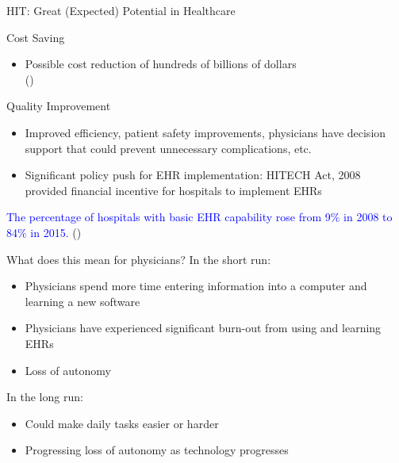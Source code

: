 \documentclass[10pt]{beamer}
\begin{document}
\begin{frame}[fragile]{HIT: Great (Expected) Potential in Healthcare}
\begin{alertblock}{Cost Saving}
\begin{itemize}
    \item Possible cost reduction of hundreds of billions of dollars \\ (\cite{hillestad2005})
\end{itemize}
\end{alertblock}

\begin{alertblock}{Quality Improvement}
\begin{itemize}
    \item Improved efficiency, patient safety improvements, physicians have decision support that could prevent unnecessary complications, etc.
    \item Significant policy push for EHR implementation: HITECH Act, 2008 provided financial incentive for hospitals to implement EHRs \nocite{hitech}
\end{itemize}
\end{alertblock}

\textcolor{blue}{The percentage of hospitals with basic EHR capability rose from 9$\%$ in 2008 to 84$\%$ in 2015.} (\cite{stats})

\end{frame}

\begin{frame}[fragile]{What does this mean for physicians?}
In the short run:
\begin{itemize}
    \item Physicians spend more time entering information into a computer and learning a new software
    \item Physicians have experienced significant burn-out from using and learning EHRs
    \item Loss of autonomy
\end{itemize}

In the long run:
\begin{itemize}
    \item Could make daily tasks easier or harder
    \item Progressing loss of autonomy as technology progresses
\end{itemize}

\end{frame}
\end{document}
